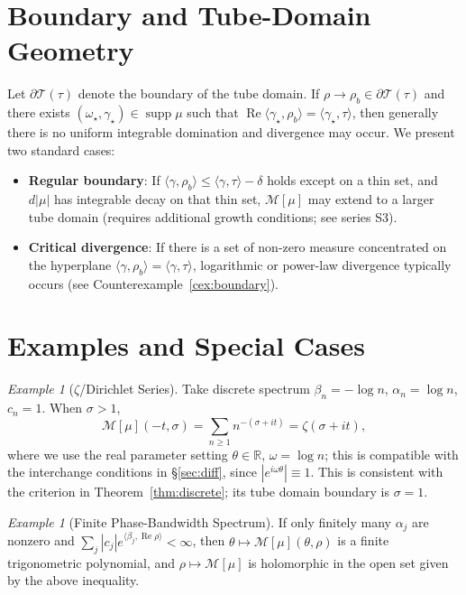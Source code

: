 \documentclass[11pt,a4paper]{article}
\theoremstyle{remark}
\newtheorem{example}[theorem]{Example}
\DeclareMathOperator{\Re}{Re}
\DeclareMathOperator{\supp}{supp}
\begin{document}
\section{Boundary and Tube-Domain Geometry}

Let $\partial\mathcal{T}(\tau)$ denote the boundary of the tube domain. If $\rho\to\rho_b\in\partial\mathcal{T}(\tau)$ and there exists $(\omega_\star,\gamma_\star)\in\supp\mu$ such that $\Re\langle\gamma_\star,\rho_b\rangle=\langle\gamma_\star,\tau\rangle$, then generally there is no uniform integrable domination and divergence may occur. We present two standard cases:

\begin{itemize}
\item \textbf{Regular boundary}: If $\langle\gamma,\rho_b\rangle\le \langle\gamma,\tau\rangle-\delta$ holds except on a thin set, and $d|\mu|$ has integrable decay on that thin set, $\mathcal{M}[\mu]$ may extend to a larger tube domain (requires additional growth conditions; see series S3).
\item \textbf{Critical divergence}: If there is a set of non-zero measure concentrated on the hyperplane $\langle\gamma,\rho_b\rangle=\langle\gamma,\tau\rangle$, logarithmic or power-law divergence typically occurs (see Counterexample~\ref{cex:boundary}).
\end{itemize}

\section{Examples and Special Cases}

\begin{example}[$\zeta$/Dirichlet Series]\label{ex:zeta}
Take discrete spectrum $\beta_n=-\log n$, $\alpha_n=\log n$, $c_n=1$. When $\sigma>1$,
\begin{equation}
\mathcal{M}[\mu](-t,\sigma)=\sum_{n\ge1}n^{-(\sigma+it)}=\zeta(\sigma+it),
\end{equation}
where we use the real parameter setting $\theta\in\mathbb{R}$, $\omega=\log n$; this is compatible with the interchange conditions in \S\ref{sec:diff}, since $|e^{i\omega\theta}|\equiv 1$. This is consistent with the criterion in Theorem~\ref{thm:discrete}; its tube domain boundary is $\sigma=1$.
\end{example}

\begin{example}[Finite Phase-Bandwidth Spectrum]\label{ex:finite}
If only finitely many $\alpha_j$ are nonzero and $\sum_j|c_j|e^{\langle\beta_j,\Re\rho\rangle}<\infty$, then $\theta\mapsto\mathcal{M}[\mu](\theta,\rho)$ is a finite trigonometric polynomial, and $\rho\mapsto\mathcal{M}[\mu]$ is holomorphic in the open set given by the above inequality.
\end{example}
\end{document}
